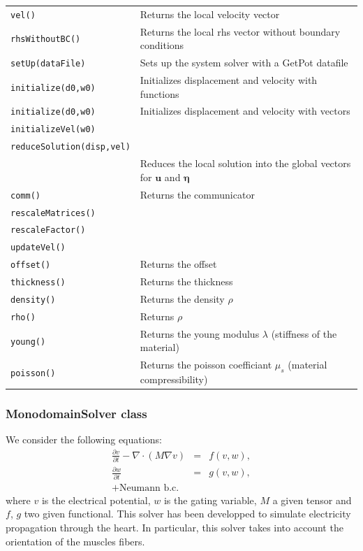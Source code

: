\documentclass[11pt]{article}
\begin{document}
\begin{center}
\begin{longtable}{p{3cm}p{8cm}}
	\texttt{vel()} & Returns the local velocity vector\\
	\texttt{rhsWithoutBC()} & Returns the local rhs vector without boundary conditions\\
	\texttt{setUp(dataFile)} & Sets up the system solver with a GetPot datafile\\
	\texttt{initialize(d0,w0)} & Initializes displacement and velocity with functions \\
	\texttt{initialize(d0,w0)} & Initializes displacement and velocity with vectors \\
	\texttt{initializeVel(w0)} & \\
	\texttt{reduceSolution(disp,vel)} \\
	& Reduces the local solution into the global vectors for $\mathbf{u}$ and $\boldsymbol{\eta}$\\
	\texttt{comm()} & Returns the communicator\\
	\texttt{rescaleMatrices()} & \\
	\texttt{rescaleFactor()} & \\
	\texttt{updateVel()} & \\
	\texttt{offset()} & Returns the offset\\
	\texttt{thickness()} & Returns the thickness\\
	\texttt{density()} & Returns the density $\rho$\\
	\texttt{rho()} & Returns $\rho$ \\
	\texttt{young()} & Returns the young modulus $\lambda$ (stiffness of the material)\\
	\texttt{poisson()} & Returns the poisson coefficiant $\mu_s$ (material compressibility)\\
	\hline
\end{longtable}
\end{center}

\subsubsection{MonodomainSolver class}
We consider the following equations:
\begin{eqnarray}
\frac{\partial v}{\partial t} - \nabla\cdot(M\nabla v) & = & f(v,w), \label{eqn:MonoDomain1}\\
\frac{\partial w}{\partial t} & = & g(v,w), \label{eqn:MonoDomain2}\\
+ \text{Neumann b.c.}\nonumber
\end{eqnarray}
where $v$ is the electrical potential, $w$ is the gating variable, $M$ a given tensor and $f$, $g$ two given functional. This solver has been developped to simulate electricity propagation through the heart. In particular, this solver takes into account the orientation of the muscles fibers.
\end{document}
